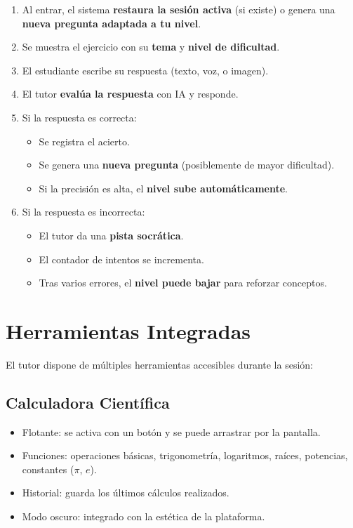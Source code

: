 \documentclass[12pt, a4paper, oneside]{book}
\begin{document}
\begin{stepbox}[title={Sesión típica de tutoría}]
\begin{enumerate}
    \item Al entrar, el sistema \textbf{restaura la sesión activa} (si existe) o genera una \textbf{nueva pregunta adaptada a tu nivel}.
    \item Se muestra el ejercicio con su \textbf{tema} y \textbf{nivel de dificultad}.
    \item El estudiante escribe su respuesta (texto, voz, o imagen).
    \item El tutor \textbf{evalúa la respuesta} con IA y responde.
    \item Si la respuesta es correcta:
    \begin{itemize}
        \item Se registra el acierto.
        \item Se genera una \textbf{nueva pregunta} (posiblemente de mayor dificultad).
        \item Si la precisión es alta, el \textbf{nivel sube automáticamente}.
    \end{itemize}
    \item Si la respuesta es incorrecta:
    \begin{itemize}
        \item El tutor da una \textbf{pista socrática}.
        \item El contador de intentos se incrementa.
        \item Tras varios errores, el \textbf{nivel puede bajar} para reforzar conceptos.
    \end{itemize}
\end{enumerate}
\end{stepbox}

\section{Herramientas Integradas}

El tutor dispone de múltiples herramientas accesibles durante la sesión:

\subsection{Calculadora Científica}

\begin{itemize}
    \item Flotante: se activa con un botón y se puede arrastrar por la pantalla.
    \item Funciones: operaciones básicas, trigonometría, logaritmos, raíces, potencias, constantes ($\pi$, $e$).
    \item Historial: guarda los últimos cálculos realizados.
    \item Modo oscuro: integrado con la estética de la plataforma.
\end{itemize}
\end{document}
